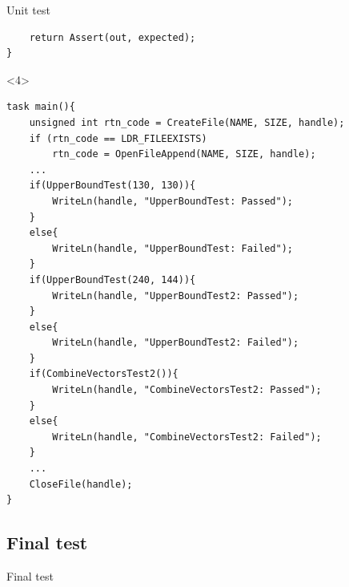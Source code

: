 \begin{frame}[fragile]{Unit test}
\begin{onlyenv}
\begin{center}
\begin{minipage}[H]{0.9\linewidth}
\begin{lstlisting}
  	return Assert(out, expected);
}
\end{lstlisting} 
\end{minipage}
\end{center}
\end{onlyenv}
\begin{onlyenv}<4>
\begin{center}
\begin{minipage}[H]{0.9\linewidth}
\begin{lstlisting}
task main(){
	unsigned int rtn_code = CreateFile(NAME, SIZE, handle);
   	if (rtn_code == LDR_FILEEXISTS)
     	rtn_code = OpenFileAppend(NAME, SIZE, handle);
  	...
 	if(UpperBoundTest(130, 130)){
    	WriteLn(handle, "UpperBoundTest: Passed");
  	}
 	else{
    	WriteLn(handle, "UpperBoundTest: Failed");
  	}
  	if(UpperBoundTest(240, 144)){
    	WriteLn(handle, "UpperBoundTest2: Passed");
  	}
  	else{
    	WriteLn(handle, "UpperBoundTest2: Failed");
  	}
  	if(CombineVectorsTest2()){
    	WriteLn(handle, "CombineVectorsTest2: Passed");
  	}
  	else{
    	WriteLn(handle, "CombineVectorsTest2: Failed");
  	}
  	...
  	CloseFile(handle);
}
\end{lstlisting} 
\end{minipage}
\end{center}
\end{onlyenv}
\end{frame}

\subsection{Final test}
\begin{frame}{Final test}
\begin{itemize}
\end{itemize}
\end{frame}
